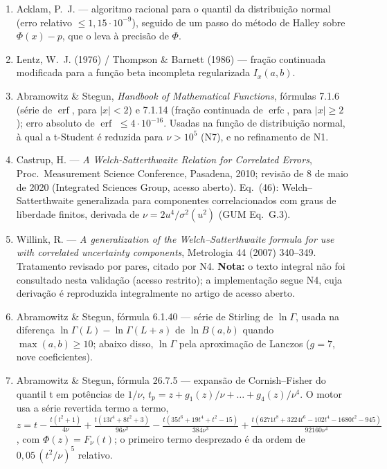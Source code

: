 \documentclass[11pt,a4paper]{article}
\begin{document}
\begin{enumerate}[label=N\arabic*., leftmargin=2.6em]
  \item Acklam, P.~J. --- algoritmo racional para o quantil da distribuição normal (erro relativo \(\leq 1{,}15 \cdot 10^{-9}\)), seguido de um passo do método de Halley sobre \(\Phi(x) - p\), que o leva à precisão de \(\Phi\).
  \item Lentz, W.~J. (1976) / Thompson \& Barnett (1986) --- fração continuada modificada para a função beta incompleta regularizada \(I_x(a,b)\).
  \item Abramowitz \& Stegun, \emph{Handbook of Mathematical Functions}, fórmulas 7.1.6 (série de \(\operatorname{erf}\), para \(|x| < 2\)) e 7.1.14 (fração continuada de \(\operatorname{erfc}\), para \(|x| \geq 2\)); erro absoluto de \(\operatorname{erf}\) \(\leq 4 \cdot 10^{-16}\). Usadas na função de distribuição normal, à qual a t-Student é reduzida para \(\nu > 10^5\) (N7), e no refinamento de N1.
  \item Castrup, H. --- \emph{A Welch-Satterthwaite Relation for Correlated Errors}, Proc.\ Measurement Science Conference, Pasadena, 2010; revisão de 8 de maio de 2020 (Integrated Sciences Group, acesso aberto). Eq.~(46): Welch--Satterthwaite generalizada para componentes correlacionados com graus de liberdade finitos, derivada de \(\nu = 2u^4/\sigma^2(u^2)\) (GUM Eq.~G.3).
  \item Willink, R. --- \emph{A generalization of the Welch--Satterthwaite formula for use with correlated uncertainty components}, Metrologia 44 (2007) 340--349. Tratamento revisado por pares, citado por N4. \textbf{Nota:} o texto integral não foi consultado nesta validação (acesso restrito); a implementação segue N4, cuja derivação é reproduzida integralmente no artigo de acesso aberto.
  \item Abramowitz \& Stegun, fórmula 6.1.40 --- série de Stirling de \(\ln\Gamma\), usada na diferença \(\ln\Gamma(L) - \ln\Gamma(L + s)\) de \(\ln B(a, b)\) quando \(\max(a, b) \geq 10\); abaixo disso, \(\ln\Gamma\) pela aproximação de Lanczos (\(g = 7\), nove coeficientes).
  \item Abramowitz \& Stegun, fórmula 26.7.5 --- expansão de Cornish--Fisher do quantil t em potências de \(1/\nu\), \(t_p = z + g_1(z)/\nu + \dots + g_4(z)/\nu^4\). O motor usa a série revertida termo a termo, \(z = t - \frac{t(t^2+1)}{4\nu} + \frac{t(13t^4+8t^2+3)}{96\nu^2} - \frac{t(35t^6+19t^4+t^2-15)}{384\nu^3} + \frac{t(6271t^8+3224t^6-102t^4-1680t^2-945)}{92160\nu^4}\), com \(\Phi(z) = F_\nu(t)\); o primeiro termo desprezado é da ordem de \(0{,}05\,(t^2/\nu)^5\) relativo.
\end{enumerate}
\end{document}
